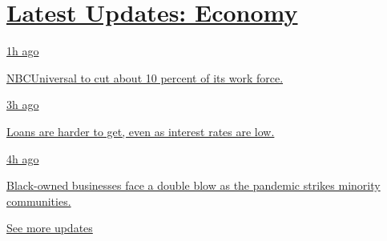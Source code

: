 \hypertarget{latest-updates-economy}{%
\section{\texorpdfstring{\href{https://www.nytimes.com/live/2020/08/04/business/stock-market-today-coronavirus?action=click\&pgtype=Article\&state=default\&region=MAIN_CONTENT_1\&context=storylines_live_updates}{Latest
Updates:
Economy}}{Latest Updates: Economy}}\label{latest-updates-economy}}

\href{https://www.nytimes.com/live/2020/08/04/business/stock-market-today-coronavirus?action=click\&pgtype=Article\&state=default\&region=MAIN_CONTENT_1\&context=storylines_live_updates\#nbcuniversal-to-cut-about-10-percent-of-its-work-force}{1h
ago}

\href{https://www.nytimes.com/live/2020/08/04/business/stock-market-today-coronavirus?action=click\&pgtype=Article\&state=default\&region=MAIN_CONTENT_1\&context=storylines_live_updates\#nbcuniversal-to-cut-about-10-percent-of-its-work-force}{NBCUniversal
to cut about 10 percent of its work force.}

\href{https://www.nytimes.com/live/2020/08/04/business/stock-market-today-coronavirus?action=click\&pgtype=Article\&state=default\&region=MAIN_CONTENT_1\&context=storylines_live_updates\#loans-are-harder-to-get-even-as-interest-rates-are-low}{3h
ago}

\href{https://www.nytimes.com/live/2020/08/04/business/stock-market-today-coronavirus?action=click\&pgtype=Article\&state=default\&region=MAIN_CONTENT_1\&context=storylines_live_updates\#loans-are-harder-to-get-even-as-interest-rates-are-low}{Loans
are harder to get, even as interest rates are low.}

\href{https://www.nytimes.com/live/2020/08/04/business/stock-market-today-coronavirus?action=click\&pgtype=Article\&state=default\&region=MAIN_CONTENT_1\&context=storylines_live_updates\#black-owned-businesses-face-a-double-blow-as-the-pandemic-strikes-minority-communities}{4h
ago}

\href{https://www.nytimes.com/live/2020/08/04/business/stock-market-today-coronavirus?action=click\&pgtype=Article\&state=default\&region=MAIN_CONTENT_1\&context=storylines_live_updates\#black-owned-businesses-face-a-double-blow-as-the-pandemic-strikes-minority-communities}{Black-owned
businesses face a double blow as the pandemic strikes minority
communities.}

\href{https://www.nytimes.com/live/2020/08/04/business/stock-market-today-coronavirus?action=click\&pgtype=Article\&state=default\&region=MAIN_CONTENT_1\&context=storylines_live_updates}{See
more updates}


